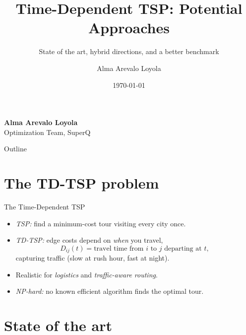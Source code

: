 \documentclass[
11pt,notheorems,hyperref={pdfauthor=Alma Arevalo Loyola}
]{beamer}
\title[TD-TSP: Potential Approaches]{Time-Dependent TSP: Potential Approaches}
\subtitle{State of the art, hybrid directions, and a better benchmark}
\author{Alma Arevalo Loyola}
\institute{Quantum Optimization Lab, SuperQ Quantum Computing Inc.}
\date{\today}
\renewcommand{\emphasize}[1]{\textcolor{emphasisblue}{\textit{#1}}}
\newcommand{\emphteal}[1]{\textcolor{emphasisteal}{\textit{#1}}}
\begin{document}
{
\begin{frame}
  \vspace*{-1.4cm}
  {\raggedleft{}\normalsize\insertdate\par}
  \vspace{1.6cm}
  {\inserttitle\par}
  \vspace{0.35cm}
  {\insertsubtitle\par}
  \vspace{0.9cm}
  {\footnotesize
    \textcolor{presenterhighlight}{\small\textbf{Alma Arevalo Loyola}}\\[0.3em]
    Optimization Team, SuperQ
  \par}
  \vfill
\end{frame}
}
\addtocounter{framenumber}{-1}

\begin{frame}{Outline}
  \tableofcontents
\end{frame}

\section{The TD-TSP problem}

\begin{frame}{The Time-Dependent TSP}
  \begin{itemize}
    \item \emphasize{TSP:} find a minimum-cost tour visiting every city once.
    \item \emphasize{TD-TSP:} edge costs depend on \emphteal{when} you travel,
    \[
      D_{ij}(t) = \text{travel time from } i \text{ to } j \text{ departing at } t,
    \]
    capturing traffic (slow at rush hour, fast at night).
    \item Realistic for \emphteal{logistics} and \emphteal{traffic-aware routing}.
    \item \emphasize{NP-hard:} no known efficient algorithm finds the optimal tour.
  \end{itemize}
\end{frame}

\section{State of the art}
\end{document}
